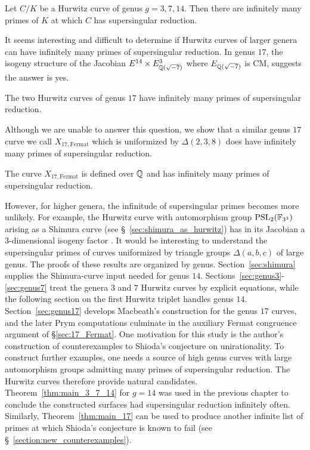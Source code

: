 \documentclass[main.tex]{subfiles}
\begin{document}
\begin{thm}\label{thm:main_3_7_14}
Let $C/K$ be a Hurwitz curve of genus $g = 3,7,14$. Then there are infinitely many primes of $K$ at which $C$ has supersingular reduction.
\end{thm}

It seems interesting and difficult to determine if Hurwitz curves of larger genera can have infinitely many primes of supersingular reduction. In genus $17$, the isogeny structure of the Jacobian $E^{14} \times E_{\mathbb{Q}(\sqrt{-7})}^3$ where $E_{\mathbb{Q}(\sqrt{-7})}$ is CM, suggests the answer is yes. 

\begin{conj}
The two Hurwitz curves of genus $17$ have infinitely many primes of supersingular reduction.
\end{conj} 

Although we are unable to answer this question, we show that a similar genus $17$ curve we call $X_{17, \mathrm{Fermat}}$ which is uniformized by $\Delta(2,3,8)$ does have infinitely many primes of supersingular reduction.

\begin{thm} \label{thm:main_17}
The curve $X_{17, \mathrm{Fermat}}$ is defined over $\mathbb{Q}$ and has infinitely many primes of supersingular reduction.
\end{thm}


However, for higher genera, the infinitude of supersingular primes becomes more unlikely. For example, the Hurwitz curve with automorphism group $\mathrm{PSL}_2(\mathbb{F}_{3^3})$ arising as a Shimura curve (see \S~\ref{sec:shimura_as_hurwitz}) has in its Jacobian a $3$-dimensional isogeny factor \cite[\S~6]{fischer:hurwitz_auts}. It would be interesting to understand the supersingular primes of curves uniformized by triangle groups $\Delta(a,b,c)$ of large genus. The proofs of these results are organized by genus. Section~\ref{sec:shimura} supplies the Shimura-curve input needed for genus $14$. Sections~\ref{sec:genus3}-\ref{sec:genus7} treat the genera $3$ and $7$ Hurwitz curves by explicit equations, while the following section on the first Hurwitz triplet handles genus $14$. Section~\ref{sec:genus17} develops Macbeath's construction for the genus $17$ curves, and the later Prym computations culminate in the auxiliary Fermat congruence argument of \S\ref{sec:17_Fermat}. One motivation for this study is the author's construction of counterexamples to Shioda's conjecture on unirationality. To construct further examples, one needs a source of high genus curves with large automorphism groups admitting many primes of supersingular reduction. The Hurwitz curves therefore provide natural candidates. Theorem~\ref{thm:main_3_7_14} for $g = 14$ was used in the previous chapter to conclude the constructed surfaces had supersingular reduction infinitely often. Similarly, Theorem~\ref{thm:main_17} can be used to produce another infinite list of primes at which Shioda's conjecture is known to fail (see \S~\ref{section:new_counterexamples}). 
\end{document}
